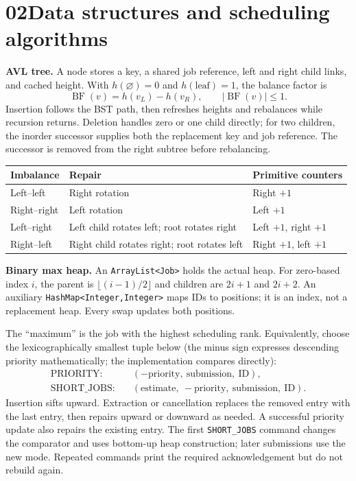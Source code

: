 \documentclass[10pt,letterpaper]{article}
\newcommand{\code}[1]{\texttt{#1}}
\newcommand{\sectiontitle}[2]{\section*{\textcolor{accent}{#1}\quad #2}}
\begin{document}
\newpage
\sectiontitle{02}{Data structures and scheduling algorithms}
\textbf{AVL tree.} A node stores a key, a shared job reference, left and right child links, and cached height. With $h(\varnothing)=0$ and $h(\text{leaf})=1$, the balance factor is
\[
  \operatorname{BF}(v)=h(v_L)-h(v_R),\qquad |\operatorname{BF}(v)|\leq 1.
\]
Insertion follows the BST path, then refreshes heights and rebalances while recursion returns. Deletion handles zero or one child directly; for two children, the inorder successor supplies both the replacement key and job reference. The successor is removed from the right subtree before rebalancing.

\begin{tabularx}{\linewidth}{@{}lYY@{}}\toprule
\textbf{Imbalance} & \textbf{Repair} & \textbf{Primitive counters}\\\midrule
Left--left & Right rotation & Right $+1$\\
Right--right & Left rotation & Left $+1$\\
Left--right & Left child rotates left; root rotates right & Left $+1$, right $+1$\\
Right--left & Right child rotates right; root rotates left & Right $+1$, left $+1$\\\bottomrule
\end{tabularx}

\textbf{Binary max heap.} An \code{ArrayList<Job>} holds the actual heap. For zero-based index $i$, the parent is $\lfloor(i-1)/2\rfloor$ and children are $2i+1$ and $2i+2$. An auxiliary \code{HashMap<Integer,Integer>} maps IDs to positions; it is an index, not a replacement heap. Every swap updates both positions.

The ``maximum'' is the job with the highest scheduling rank. Equivalently, choose the lexicographically smallest tuple below (the minus sign expresses descending priority mathematically; the implementation compares directly):
\[
\begin{aligned}
\text{PRIORITY:}&\quad(-\text{priority},\ \text{submission},\ \text{ID}),\\
\text{SHORT\_JOBS:}&\quad(\text{estimate},\ -\text{priority},\ \text{submission},\ \text{ID}).
\end{aligned}
\]
Insertion sifts upward. Extraction or cancellation replaces the removed entry with the last entry, then repairs upward or downward as needed. A successful priority update also repairs the existing entry. The first \code{SHORT\_JOBS} command changes the comparator and uses bottom-up heap construction; later submissions use the new mode. Repeated commands print the required acknowledgement but do not rebuild again.
\end{document}
